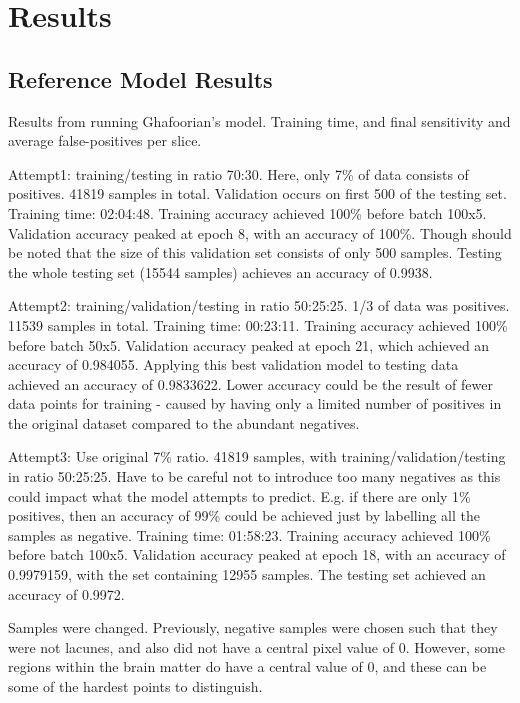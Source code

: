 %
%

\chapter{Results}\label{results}

\citep{AdamsH.H.Hieab2013RMfD}

\section{Reference Model Results}

Results from running Ghafoorian's model. Training time, and final sensitivity and average false-positives per slice.


Attempt1: training/testing in ratio 70:30. Here, only 7\% of data consists of positives. 41819 samples in total. Validation occurs on first 500 of the testing set. Training time: 02:04:48.
Training accuracy achieved 100\% before batch 100x5. Validation accuracy peaked at epoch 8, with an accuracy of 100\%. Though should be noted that the size of this validation set consists of only 500 samples. Testing the whole testing set (15544 samples) achieves an accuracy of 0.9938.

Attempt2: training/validation/testing in ratio 50:25:25. 1/3 of data was positives. 11539 samples in total. Training time: 00:23:11.
Training accuracy achieved 100\% before batch 50x5. Validation accuracy peaked at epoch 21, which achieved an accuracy of 0.984055. Applying this best validation model to testing data achieved an accuracy of 0.9833622. Lower accuracy could be the result of fewer data points for training - caused by having only a limited number of positives in the original dataset compared to the abundant negatives.

Attempt3: Use original 7\% ratio. 41819 samples, with training/validation/testing in ratio 50:25:25. Have to be careful not to introduce too many negatives as this could impact what the model attempts to predict. E.g. if there are only 1\% positives, then an accuracy of 99\% could be achieved just by labelling all the samples as negative. Training time: 01:58:23.
Training accuracy achieved 100\% before batch 100x5. Validation accuracy peaked at epoch 18, with an accuracy of 0.9979159, with the set containing 12955 samples. The testing set achieved an accuracy of 0.9972.



Samples were changed. Previously, negative samples were chosen such that they were not lacunes, and also did not have a central pixel value of 0. However, some regions within the brain matter do have a central value of 0, and these can be some of the hardest points to distinguish.

